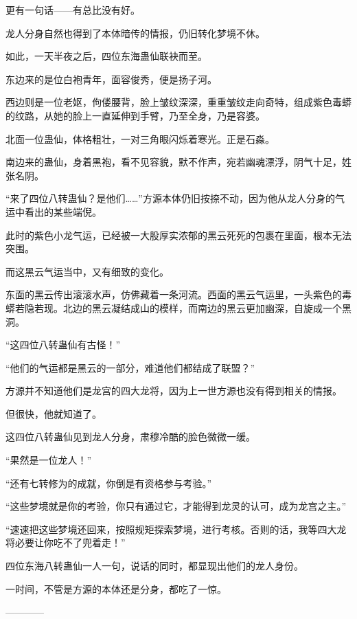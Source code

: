 \begin{this_body}
更有一句话——有总比没有好。

龙人分身自然也得到了本体暗传的情报，仍旧转化梦境不休。

如此，一天半夜之后，四位东海蛊仙联袂而至。

东边来的是位白袍青年，面容俊秀，便是扬子河。

西边则是一位老妪，佝偻腰背，脸上皱纹深深，重重皱纹走向奇特，组成紫色毒蟒的纹路，从她的脸上一直延伸到手臂，乃至全身，乃是容婆。

北面一位蛊仙，体格粗壮，一对三角眼闪烁着寒光。正是石淼。

南边来的蛊仙，身着黑袍，看不见容貌，默不作声，宛若幽魂漂浮，阴气十足，姓张名阴。

“来了四位八转蛊仙？是他们……”方源本体仍旧按捺不动，因为他从龙人分身的气运中看出的某些端倪。

此时的紫色小龙气运，已经被一大股厚实浓郁的黑云死死的包裹在里面，根本无法突围。

而这黑云气运当中，又有细致的变化。

东面的黑云传出滚滚水声，仿佛藏着一条河流。西面的黑云气运里，一头紫色的毒蟒若隐若现。北边的黑云凝结成山的模样，而南边的黑云更加幽深，自旋成一个黑洞。

“这四位八转蛊仙有古怪！”

“他们的气运都是黑云的一部分，难道他们都结成了联盟？”

方源并不知道他们是龙宫的四大龙将，因为上一世方源也没有得到相关的情报。

但很快，他就知道了。

这四位八转蛊仙见到龙人分身，肃穆冷酷的脸色微微一缓。

“果然是一位龙人！”

“还有七转修为的成就，你倒是有资格参与考验。”

“这些梦境就是你的考验，你只有通过它，才能得到龙灵的认可，成为龙宫之主。”

“速速把这些梦境还回来，按照规矩探索梦境，进行考核。否则的话，我等四大龙将必要让你吃不了兜着走！”

四位东海八转蛊仙一人一句，说话的同时，都显现出他们的龙人身份。

一时间，不管是方源的本体还是分身，都吃了一惊。

------------

\end{this_body}

